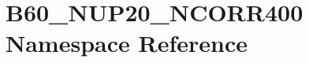 \hypertarget{namespace_b60___n_u_p20___n_c_o_r_r400}{}\section{B60\+\_\+\+N\+U\+P20\+\_\+\+N\+C\+O\+R\+R400 Namespace Reference}
\label{namespace_b60___n_u_p20___n_c_o_r_r400}
